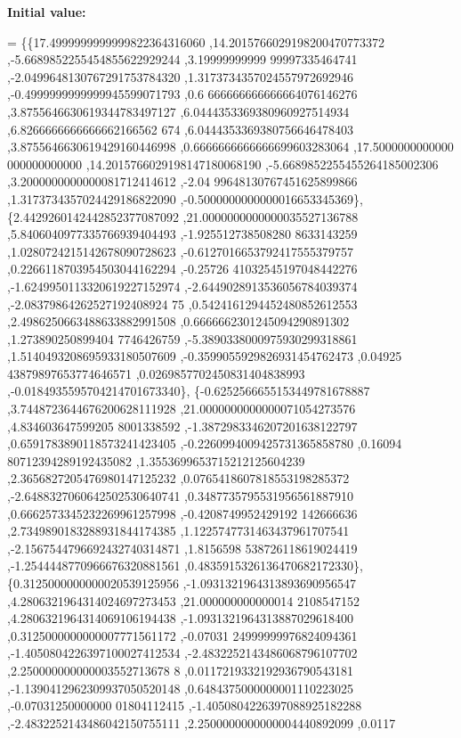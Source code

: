 {\bfseries Initial value\+:}
\begin{DoxyCode}
= \{\{17.4999999999999822364316060 ,14.2015766029198200470773372 ,-5.6689852255454855622929244 ,3.19999999999
      99997335464741 ,-2.0499648130767291753784320 ,1.3173734357024557972692946 ,-0.4999999999999945599071793 ,0.6
      666666666666664076146276 ,3.8755646630619344783497127 ,6.0444353369380960927514934 ,6.8266666666666662166562
      674 ,6.0444353369380756646478403 ,3.8755646630619429160446998 ,0.6666666666666699603283064 ,17.5000000000000
      000000000000 ,14.2015766029198147180068190 ,-5.6689852255455264185002306 ,3.2000000000000081712414612 ,-2.04
      99648130767451625899866 ,1.3173734357024429186822090 ,-0.5000000000000016653345369\},
\{2.4429260142442852377087092 ,21.0000000000000035527136788 ,5.8406040977335766939404493 ,-1.925512738508280
      8633143259 ,1.0280724215142678090728623 ,-0.6127016653792417555379757 ,0.2266118703954503044162294 ,-0.25726
      41032545197048442276 ,-1.6249950113320619227152974 ,-2.6449028913536056784039374 ,-2.08379864262527192408924
      75 ,0.5424161294452480852612553 ,2.4986250663488633882991508 ,0.6666662301245094290891302 ,1.273890250899404
      7746426759 ,-5.3890338000975930299318861 ,1.5140493208695933180507609 ,-0.3599055929826931454762473 ,0.04925
      43879897653774646571 ,0.0269857702450831404838993 ,-0.0184935595704214701673340\},
\{-0.6252566655153449781678887 ,3.7448723644676200628111928 ,21.0000000000000071054273576 ,4.834603647599205
      8001338592 ,-1.3872983346207201638122797 ,0.6591783890118573241423405 ,-0.2260994009425731365858780 ,0.16094
      80712394289192435082 ,1.3553699653715212125604239 ,2.3656827205476980147125232 ,0.0765418607818553198285372 
      ,-2.6488327060642502530640741 ,0.3487735795531956561887910 ,0.6662573345232269961257998 ,-0.4208749952429192
      142666636 ,2.7349890183288931844174385 ,1.1225747731463437961707541 ,-2.1567544796692432740314871 ,1.8156598
      538726118619024419 ,-1.2544448770966676320881561 ,0.4835915326136470682172330\},
\{0.3125000000000020539125956 ,-1.0931321964313893690956547 ,4.2806321964314024697273453 ,21.000000000000014
      2108547152 ,4.2806321964314069106194438 ,-1.0931321964313887029618400 ,0.3125000000000007771561172 ,-0.07031
      24999999976824094361 ,-1.4050804226397100027412534 ,-2.4832252143486068796107702 ,2.250000000000003552713678
      8 ,0.0117219332192936790543181 ,-1.1390412962309937050520148 ,0.6484375000000001110223025 ,-0.07031250000000
      01804112415 ,-1.4050804226397088925182288 ,-2.4832252143486042150755111 ,2.2500000000000004440892099 ,0.0117

\end{DoxyCode}
